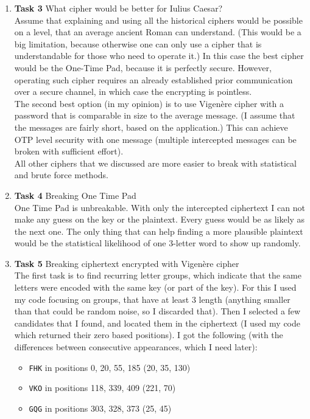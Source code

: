 \documentclass{article}
\begin{document}
\begin{enumerate}[label={}]
	\item \textbf{Task 3} What cipher would be better for Iulius Caesar?\\
		Assume that explaining and using all the historical ciphers would be possible on a level, that an average ancient Roman can understand. (This would be a big limitation, because otherwise one can only use a cipher that is understandable for those who need to operate it.) In this case the best cipher would be the One-Time Pad, because it is perfectly secure. However, operating such cipher requires an already established prior communication over a secure channel, in which case the encrypting is pointless.\\
		The second best option (in my opinion) is to use Vigenère cipher with a password that is comparable in size to the average message. (I assume that the messages are fairly short, based on the application.) This can achieve OTP level security with one message (multiple intercepted messages can be broken with sufficient effort).\\
		All other ciphers that we discussed are more easier to break with statistical and brute force methods.
	\item \textbf{Task 4} Breaking One Time Pad\\
		One Time Pad is unbreakable. With only the intercepted ciphertext I can not make any guess on the key or the plaintext. Every guess would be as likely as the next one. The only thing that can help finding a more plausible plaintext would be the statistical likelihood of one 3-letter word to show up randomly.
	\item \textbf{Task 5} Breaking ciphertext encrypted with Vigenère cipher\\
		The first task is to find recurring letter groups, which indicate that the same letters were encoded with the same key (or part of the key). For this I used my code focusing on groups, that have at least 3 length (anything smaller than that could be random noise, so I discarded that). Then I selected a few candidates that I found, and located them in the ciphertext (I used my code which returned their zero based positions). I got the following (with the differences between consecutive appearances, which I need later):
		\begin{itemize}
			\item \texttt{FHK} in positions 0, 20, 55, 185 (20, 35, 130)
			\item \texttt{VKO} in positions 118, 339, 409 (221, 70)
			\item \texttt{GQG} in positions 303, 328, 373 (25, 45)

\end{itemize}
\end{enumerate}
\end{document}
